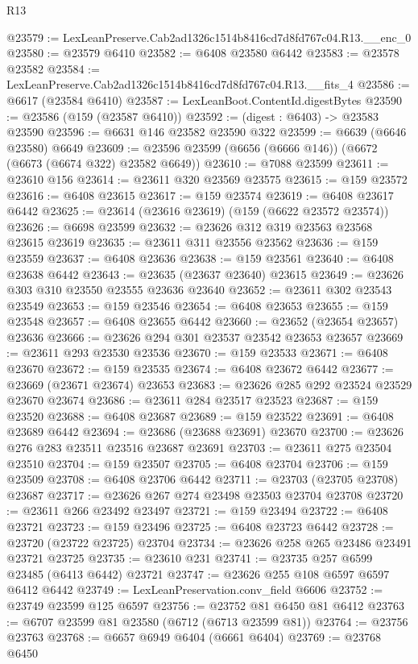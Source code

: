 \begin{lexlean}{R13}
\begin{coremodule}
@23579 := LexLeanPreserve.Cab2ad1326c1514b8416cd7d8fd767c04.R13.__enc_0
@23580 := @23579 @6410
@23582 := @6408 @23580 @6442
@23583 := @23578 @23582
@23584 := LexLeanPreserve.Cab2ad1326c1514b8416cd7d8fd767c04.R13.__fits_4
@23586 := @6617 (@23584 @6410)
@23587 := LexLeanBoot.ContentId.digestBytes
@23590 := @23586 (@159 (@23587 @6410))
@23592 := (digest : @6403) -> @23583 @23590
@23596 := @6631 @146 @23582 @23590 @322
@23599 := @6639 (@6646 @23580) @6649
@23609 := @23596 @23599 (@6656 (@6666 @146)) (@6672 (@6673 (@6674 @322) @23582 @6649))
@23610 := @7088 @23599
@23611 := @23610 @156
@23614 := @23611 @320 @23569 @23575
@23615 := @159 @23572
@23616 := @6408 @23615
@23617 := @159 @23574
@23619 := @6408 @23617 @6442
@23625 := @23614 (@23616 @23619) (@159 (@6622 @23572 @23574))
@23626 := @6698 @23599
@23632 := @23626 @312 @319 @23563 @23568 @23615 @23619
@23635 := @23611 @311 @23556 @23562
@23636 := @159 @23559
@23637 := @6408 @23636
@23638 := @159 @23561
@23640 := @6408 @23638 @6442
@23643 := @23635 (@23637 @23640) @23615
@23649 := @23626 @303 @310 @23550 @23555 @23636 @23640
@23652 := @23611 @302 @23543 @23549
@23653 := @159 @23546
@23654 := @6408 @23653
@23655 := @159 @23548
@23657 := @6408 @23655 @6442
@23660 := @23652 (@23654 @23657) @23636
@23666 := @23626 @294 @301 @23537 @23542 @23653 @23657
@23669 := @23611 @293 @23530 @23536
@23670 := @159 @23533
@23671 := @6408 @23670
@23672 := @159 @23535
@23674 := @6408 @23672 @6442
@23677 := @23669 (@23671 @23674) @23653
@23683 := @23626 @285 @292 @23524 @23529 @23670 @23674
@23686 := @23611 @284 @23517 @23523
@23687 := @159 @23520
@23688 := @6408 @23687
@23689 := @159 @23522
@23691 := @6408 @23689 @6442
@23694 := @23686 (@23688 @23691) @23670
@23700 := @23626 @276 @283 @23511 @23516 @23687 @23691
@23703 := @23611 @275 @23504 @23510
@23704 := @159 @23507
@23705 := @6408 @23704
@23706 := @159 @23509
@23708 := @6408 @23706 @6442
@23711 := @23703 (@23705 @23708) @23687
@23717 := @23626 @267 @274 @23498 @23503 @23704 @23708
@23720 := @23611 @266 @23492 @23497
@23721 := @159 @23494
@23722 := @6408 @23721
@23723 := @159 @23496
@23725 := @6408 @23723 @6442
@23728 := @23720 (@23722 @23725) @23704
@23734 := @23626 @258 @265 @23486 @23491 @23721 @23725
@23735 := @23610 @231
@23741 := @23735 @257 @6599 @23485 (@6413 @6442) @23721
@23747 := @23626 @255 @108 @6597 @6597 @6412 @6442
@23749 := LexLeanPreservation.conv_field @6606
@23752 := @23749 @23599 @125 @6597
@23756 := @23752 @81 @6450 @81 @6412
@23763 := @6707 @23599 @81 @23580 (@6712 (@6713 @23599 @81))
@23764 := @23756 @23763
@23768 := @6657 @6949 @6404 (@6661 @6404)
@23769 := @23768 @6450

\end{coremodule}
\end{lexlean}
